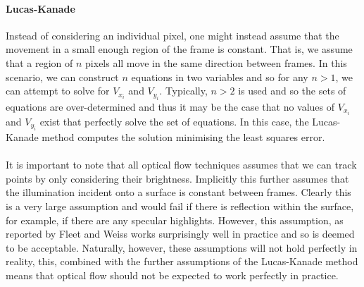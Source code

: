 \paragraph{Lucas-Kanade}
Instead of considering an individual pixel, one might instead assume that the movement in a small enough region of the frame is constant. That is, we assume that a region of $n$ pixels all move in the same direction between frames.
In this scenario, we can construct $n$ equations in two variables and so for any $n>1$, we can attempt to solve for $V_{x_i}$ and $V_{y_i}$. Typically, $n>2$ is used and so the sets of equations are over-determined and thus it may
be the case that no values of $V_{x_i}$ and $V_{y_i}$ exist that perfectly solve the set of equations. In this case, the Lucas-Kanade method computes the solution minimising the least squares error.
\\\\
It is important to note that all optical flow techniques assumes that we can track points by only considering their brightness. Implicitly this further assumes that the illumination incident onto a surface 
is constant between frames. Clearly this is a very large assumption and would fail if there is reflection within the surface, for example, if there are any specular highlights. However, this assumption, as reported by 
Fleet and Weiss \cite{Fleet2006} works surprisingly well in practice and so is deemed to be acceptable. Naturally, however, these assumptions will not hold perfectly in reality, this, combined with the further assumptions
of the Lucas-Kanade method means that optical flow should not be expected to work perfectly in practice. 
